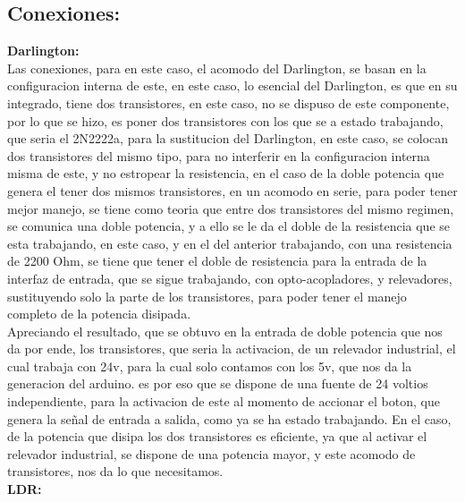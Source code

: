 \documentclass[12pt,a4paper]{article}
\begin{document}
\subsection{Conexiones:}

\textbf{Darlington:}\\

Las conexiones, para en este caso, el acomodo del Darlington, se basan en la configuracion interna de este, en este caso, lo esencial del Darlington, es que en su integrado, tiene dos transistores, en este caso, no se dispuso de este componente, por lo que se hizo, es poner dos transistores con los que se a estado trabajando, que seria el 2N2222a, para la sustitucion del Darlington, en este caso, se colocan dos transistores del mismo tipo, para no interferir en la configuracion interna misma de este, y no estropear la resistencia, en el caso de la doble potencia que genera el tener dos mismos transistores, en un acomodo en serie, para poder tener mejor manejo, se tiene como teoria que entre dos transistores del mismo regimen, se comunica una doble potencia, y a ello se le da el doble de la resistencia que se esta trabajando, en este caso, y en el del anterior trabajando, con una resistencia de 2200 Ohm, se tiene que tener el doble de resistencia para la entrada de la interfaz de entrada, que se sigue trabajando, con opto-acopladores, y relevadores, sustituyendo solo la parte de los transistores, para poder tener el manejo completo de la potencia disipada.\\

Apreciando el resultado, que se obtuvo en la entrada de doble potencia que nos da por ende, los transistores, que seria la activacion, de un relevador industrial, el cual trabaja con 24v, para la cual solo contamos con los 5v, que nos da la generacion del arduino. es por eso que se dispone de una fuente de 24 voltios independiente, para la activacion de este al momento de accionar el boton, que genera la señal de entrada a salida, como ya se ha estado trabajando. En el caso, de la potencia que disipa los dos transistores es eficiente, ya que al activar el relevador industrial, se dispone de una potencia mayor, y este acomodo de transistores, nos da lo que necesitamos.\\

\textbf{LDR:}\\
\end{document}
